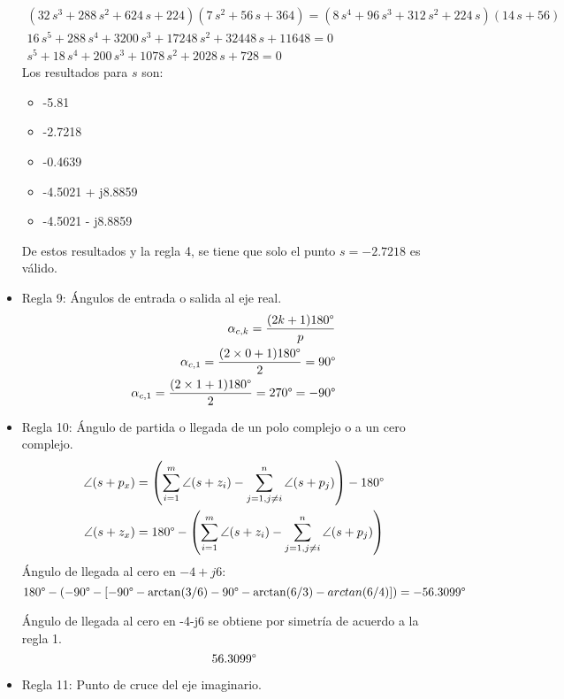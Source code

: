 \begin{itemize}
  \begin{align*}
    (32\,s^3 + 288\,s^2 + 624\,s + 224)(7\,s^2+56\,s+364) = (8\,s^4+96\,s^3+312\,s^2+224\,s)(14\,s+56)
    \\
    16\,s^5+288\,s^4+3200\,s^3+17248\,s^2+32448\,s+11648 = 0
    \\
    s^5+18\,s^4+200\,s^3+1078\,s^2+2028\,s+728 = 0
  \end{align*}
  Los resultados para $s$ son:
  \begin{itemize}
    \item -5.81
    \item -2.7218
    \item -0.4639
    \item -4.5021 + j8.8859
    \item -4.5021 - j8.8859
  \end{itemize}
  De estos resultados y la regla 4, se tiene que solo el punto $s=-2.7218$ es válido.
  \item Regla 9: Ángulos de entrada o salida al eje real.
  \begin{align*}
    \alpha_{c,k} = \frac{(2k+1)180\degree}{p}
    \\
    \alpha_{c,1} = \frac{(2\times0+1)180\degree}{2} = 90\degree
    \\
    \alpha_{c,1} = \frac{(2\times1+1)180\degree}{2} = 270\degree = -90\degree    
  \end{align*}
  \item Regla 10: Ángulo de partida o llegada de un polo complejo o a un cero complejo.
  \begin{align*}
    \angle (s+p_x) &= \left(\sum_{i=1}^m \angle(s+z_i) - \sum_{j=1,j\neq i}^n \angle(s+p_j)\right)-180\degree
    \\
    \angle (s+z_x) &= 180\degree - \left(\sum_{i=1}^m \angle(s+z_i) - \sum_{j=1,j\neq i}^n \angle(s+p_j)\right)
  \end{align*}
  Ángulo de llegada al cero en $-4+j6$:
  \begin{equation*}
    180\degree - ( -90\degree - [-90\degree-\arctan(3/6) - 90\degree - \arctan(6/3) - arctan(6/4)] ) = -56.3099\degree
  \end{equation*}

  Ángulo de llegada al cero en -4-j6 se obtiene por simetría de acuerdo a la regla 1.
  \begin{equation*}
    56.3099\degree
  \end{equation*}
  \item Regla 11: Punto de cruce del eje imaginario.


\end{itemize}
